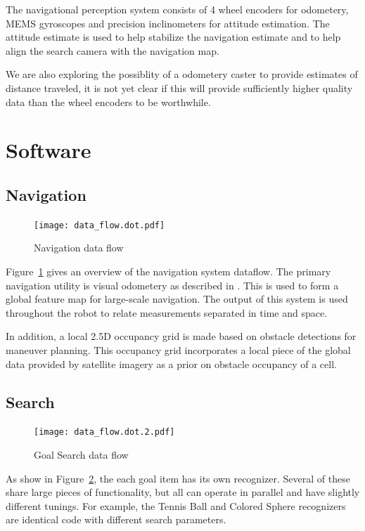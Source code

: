 \documentclass[12pt]{article}
\begin{document}
The navigational perception system consists of 4 wheel encoders for odometery, MEMS gyroscopes and precision inclinometers for attitude estimation. The attitude estimate is used to help stabilize the navigation estimate and to help align the search camera with the navigation map.

We are also exploring the possiblity of a odometery caster to provide estimates of distance traveled, it is not yet clear if this will provide sufficiently higher quality data than the wheel encoders to be worthwhile.

\section{Software}\label{Software}

\subsection{Navigation}\label{Navigation}
\begin{figure}
\centering
\texttt{[image: data\_flow.dot.pdf]}
\caption{Navigation data flow}
\label{fig_df_nav}
\end{figure}
Figure~\ref{fig_df_nav} gives an overview of the navigation system dataflow. The primary navigation utility is visual odometery as described in \cite{KKonoLSVO}. This is used to form a global feature map for large-scale navigation. The output of this system is used throughout the robot to relate measurements separated in time and space.

In addition, a local 2.5D occupancy grid is made based on obstacle detections for maneuver planning. This occupancy grid incorporates a local piece of the global data provided by satellite imagery as a prior on obstacle occupancy of a cell.

\subsection{Search}\label{Search}
\begin{figure}
\centering
\texttt{[image: data\_flow.dot.2.pdf]}
\caption{Goal Search data flow}
\label{fig_df_gs}
\end{figure}
As show in Figure~\ref{fig_df_gs}, the each goal item has its own recognizer. Several of these share large pieces of functionality, but all can operate in parallel and have slightly different tunings. For example, the Tennis Ball and Colored Sphere recognizers are identical code with different search parameters.
\end{document}
